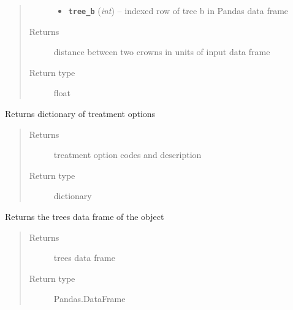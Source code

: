 \documentclass[letterpaper,10pt,english]{sphinxmanual}
\begin{document}
\begin{fulllineitems}
\begin{fulllineitems}
\begin{quote}
\begin{description}
\begin{itemize}
\item {} 
\textbf{\texttt{tree\_b}} (\emph{int}) -- indexed row of tree b in Pandas data frame

\end{itemize}

\item[{Returns}] \leavevmode
distance between two crowns in units of input data frame

\item[{Return type}] \leavevmode
float

\end{description}\end{quote}

\end{fulllineitems}


\begin{fulllineitems}
\label{SpaceCrowns:intervene.SpaceCrowns.get_treatment_options}
Returns dictionary of treatment options
\begin{quote}\begin{description}
\item[{Returns}] \leavevmode
treatment option codes and description

\item[{Return type}] \leavevmode
dictionary

\end{description}\end{quote}

\end{fulllineitems}


\begin{fulllineitems}
\label{SpaceCrowns:intervene.SpaceCrowns.get_trees}
Returns the trees data frame of the object
\begin{quote}\begin{description}
\item[{Returns}] \leavevmode
trees data frame

\item[{Return type}] \leavevmode
Pandas.DataFrame

\end{description}\end{quote}


\end{fulllineitems}
\end{fulllineitems}
\end{document}
